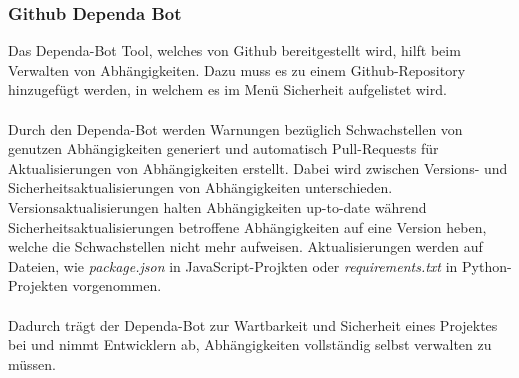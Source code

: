 \subsubsection{Github Dependa Bot} \label{sec:Dependa}
Das Dependa-Bot Tool, welches von Github bereitgestellt wird, hilft beim Verwalten von Abhängig\-keiten.
Dazu muss es zu einem Github-Repository hinzugefügt werden, in welchem es im Menü Sicherheit aufgelistet wird.
\\ \\
Durch den Dependa-Bot werden Warnungen bezüglich Schwachstellen von genutzen Abhängigkeiten generiert und automatisch Pull-Requests für Aktualisierungen von Abhängigkeiten erstellt.
Dabei wird zwischen Versions- und Sicherheitsaktualisierungen von Abhängigkeiten unterschieden.
Versionsaktualisierungen halten Abhängigkeiten up-to-date während Sicherheitsaktualisierungen betroffene Abhängigkeiten auf eine Version heben, welche die Schwachstellen nicht mehr aufweisen.
Aktualisierungen werden auf Dateien, wie \textit{package.json} in JavaScript-Projkten oder \textit{requirements.txt} in Python-Projekten vorgenommen.
\\ \\
Dadurch trägt der Dependa-Bot zur Wartbarkeit und Sicherheit eines Projektes bei und nimmt Entwicklern ab, Abhängigkeiten vollständig selbst verwalten zu müssen.